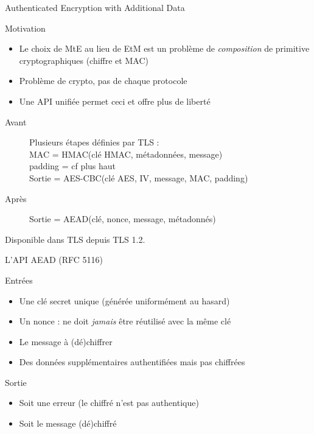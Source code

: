 \documentclass{mpg-ep-slides}
\begin{document}
\begin{frame}{Authenticated Encryption with Additional Data}
  \begin{block}{Motivation}
    \begin{itemize}
      \item Le choix de MtE au lieu de EtM est un problème de
        \emph{composition} de primitive cryptographiques (chiffre et MAC)
      \item Problème de crypto, pas de chaque protocole
      \item Une API unifiée permet ceci et offre plus de liberté
    \end{itemize}
  \end{block}

  \begin{description}
    \item[Avant] Plusieurs étapes définies par TLS :\\
      MAC = HMAC(clé HMAC, métadonnées, message)\\
      padding = cf plus haut\\
      Sortie = AES-CBC(clé AES, IV, message, MAC, padding)\\
    \item[Après] Sortie = AEAD(clé, nonce, message, métadonnés)
  \end{description}

  Disponible dans TLS depuis TLS 1.2.
\end{frame}

\begin{frame}{L'API AEAD (RFC 5116)}
  \begin{block}{Entrées}
    \begin{itemize}
      \item Une clé secret unique (générée uniformément au hasard)
      \item Un nonce : ne doit \emph{jamais} être réutilisé avec la même clé
      \item Le message à (dé)chiffrer
      \item Des données supplémentaires authentifiées mais pas chiffrées
    \end{itemize}
  \end{block}
  \begin{block}{Sortie}
    \begin{itemize}
      \item Soit une erreur (le chiffré n'est pas authentique)
      \item Soit le message (dé)chiffré
    \end{itemize}
  \end{block}
\end{frame}
\end{document}
